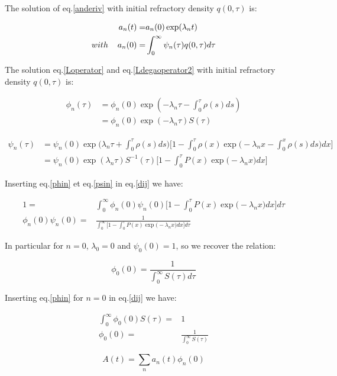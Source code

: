 \documentclass[a4paper,12pt,twoside]{article}
\def \be {\begin{equation}}
\def \ee {\end{equation}}
\begin{document}
The solution of eq.\eqref{anderiv} with initial refractory density $q(0,\tau)$ is:

\begin{align}
\label{ant}
a_n(t) = &a_n(0)\exp(\lambda_nt)\\
with \hspace{0.4cm} a_n(0) = & \int_{0}^{\infty}\psi_n(\tau)q(0,\tau)d\tau
\end{align}

The solution eq.\eqref{Loperator}  and eq.\eqref{Ldegaoperator2} with initial refractory density $q(0,\tau)$ is:

\begin{align}
\label{phin}
\phi_n(\tau)&=\phi_n(0)\exp(-\lambda_n\tau-\int_0^\tau\rho(s)ds)\nonumber\\
				  &=\phi_n(0)\exp(-\lambda_n\tau)S(\tau)
\end{align}

\begin{align}
\label{psin}
\psi_n(\tau)&=\psi_n(0)\exp\big(\lambda_n\tau+\int_0^\tau\rho(s)ds\big)\nonumber\big[1-\int^\tau_0 \rho(x) \exp\big(-\lambda_nx-\int_0^x\rho(s)ds\big)dx\big]\\
&=\psi_n(0)\exp(\lambda_n\tau)S^{-1}(\tau)\big[1-\int^\tau_0 P(x) \exp\big(-\lambda_nx)dx\big]
\end{align}



Inserting eq.\eqref{phin} et eq.\eqref{psin} in eq.\ref{dij} we have:

\begin{align}
1=&\int_0^{\infty}\phi_n(0)\psi_n(0)\big[1-\int^\tau_0 P(x) \exp\big(-\lambda_nx)dx\big]d\tau \\
\phi_n(0)\psi_n(0) =&\frac{1}{\int_0^{\infty}\big[1-\int^\tau_0 P(x) \exp\big(-\lambda_nx)dx\big]d\tau}
\end{align}

In particular for $n=0$, $\lambda_0=0$ and $\psi_0(0)=1$, so we recover the relation:

\be
\phi_0(0) = \frac{1}{\int_0^{\infty}S(\tau)d\tau}
\ee

Inserting eq.\eqref{phin} for $n=0$ in eq.\ref{dij} we have:

\begin{align}
\int_0^{\infty}\phi_0(0)S(\tau) =& 1 \\
\phi_0(0) =& \frac{1}{\int_0^{\infty}S(\tau)}
\end{align}

\be
A(t)=\sum_n a_n(t)\phi_n(0)
\ee
\end{document}
